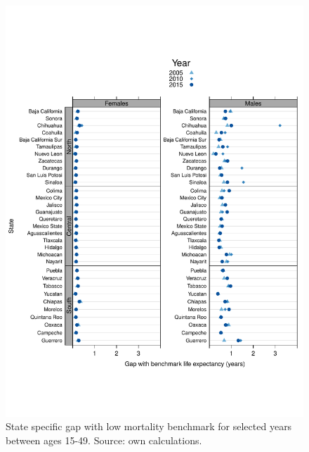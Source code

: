 \documentclass[11.5pt]{article}
\begin{document}
{\begin{figure}
\centering
\caption{State specific gap with low mortality benchmark for selected years between ages 15-49. Source: own calculations.}
\begin{center}
\includegraphics[scale=.8]{Distance_ya.pdf}
\end{center}
\end{figure}

}
\end{document}
